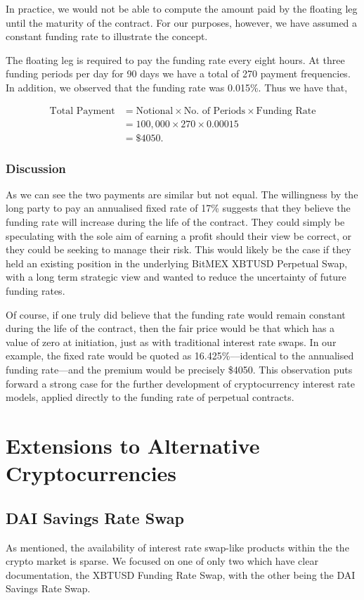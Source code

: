 In practice, we would not be able to compute the amount paid by the floating leg until the maturity of the contract. For our purposes, however, we have assumed a constant funding rate to illustrate the concept. 

The floating leg is required to pay the funding rate every eight hours. At three funding periods per day for 90 days we have a total of 270 payment frequencies. In addition, we observed that the funding rate was 0.015\%. Thus we have that,

\begin{align}
    \text{Total Payment} &= \text{Notional} \times \text{No. of Periods} \times \text{Funding Rate} \\
    &= 100,000 \times 270 \times 0.00015 \\
    &= \$4050.
\end{align}

\subsubsection{Discussion}
As we can see the two payments are similar but not equal. The willingness by the long party to pay an annualised fixed rate of 17\% suggests that they believe the funding rate will increase during the life of the contract. They could simply be speculating with the sole aim of earning a profit should their view be correct, or they could be seeking to manage their risk. This would likely be the case if they held an existing position in the underlying BitMEX XBTUSD Perpetual Swap, with a long term strategic view and wanted to reduce the uncertainty of future funding rates. 

Of course, if one truly did believe that the funding rate would remain constant during the life of the contract, then the fair price would be that which has a value of zero at initiation, just as with traditional interest rate swaps. In our example, the fixed rate would be quoted as 16.425\%––identical to the annualised funding rate––and the premium would be precisely \$4050. This observation puts forward a strong case for the further development of cryptocurrency interest rate models, applied directly to the funding rate of perpetual contracts. 

\section{Extensions to Alternative Cryptocurrencies}

\subsection{DAI Savings Rate Swap}
As mentioned, the availability of interest rate swap-like products within the the crypto market is sparse. We focused on one of only two which have clear documentation, the XBTUSD Funding Rate Swap, with the other being the DAI Savings Rate Swap.

